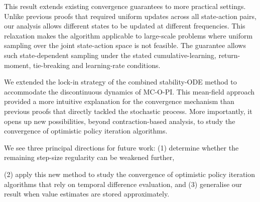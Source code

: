 This result extends existing convergence guarantees to more practical settings. Unlike previous proofs that required uniform updates across all state-action pairs, our analysis allows different states to be updated at different frequencies.
This relaxation makes the algorithm applicable to large-scale problems where uniform sampling over the joint state-action space is not feasible.
The guarantee allows such state-dependent sampling under the stated cumulative-learning, return-moment, tie-breaking and learning-rate conditions.





We extended the lock-in strategy of the combined stability-ODE method to accommodate the discontinuous dynamics of MC-O-PI.
This mean-field approach provided a more intuitive explanation for the convergence mechanism than previous proofs that directly tackled the stochastic process.
More importantly, it opens up new possibilities, beyond contraction-based analysis, to study the convergence of optimistic policy iteration algorithms.



We see three principal directions for future work:
(1) determine whether the remaining step-size regularity can be weakened further,

(2) apply this new method to study the convergence of optimistic policy iteration algorithms that rely on temporal difference evaluation,
and (3) generalise our result when value estimates are stored approximately.
































\clearpage
